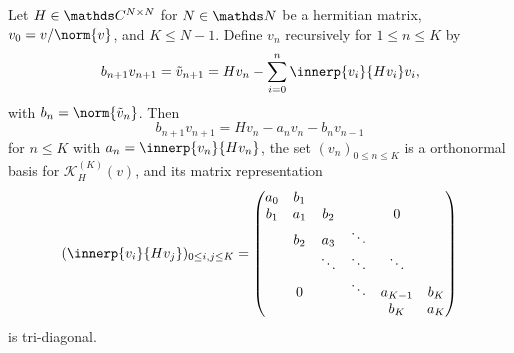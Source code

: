 \begin{lemma}
    Let \(H\in \C^{N\times N}\) for \(N\in\N\) be a hermitian matrix, \(v_0 = v / \norm{v}\), and \(K \leq N-1\).
    Define \(v_n\) recursively for \(1 \leq n \leq K\) by
    \begin{equation}
        b_{n+1}v_{n+1} = \tilde v_{n+1} = H v_n - \sum_{i=0}^n \innerp{v_i}{H v_i} v_i
        ,
    \end{equation}
    with \(b_n = \norm{\tilde v_n}\).
    Then
    \begin{equation}
        b_{n+1} v_{n+1} = H v_n - a_n v_n - b_n v_{n-1}
    \end{equation}
    for \(n\leq K\) with \(a_n = \innerp{v_n}{H v_n}\),
    the set \((v_n)_{0\leq n \leq K}\) is a orthonormal basis for \(\mathcal{K}^{(K)}_H(v)\), and its matrix representation
    \begin{equation}
        (\innerp{v_i}{H v_j})_{0 \leq i,j \leq K} = 
        \begin{pmatrix}
            a_0 & b_1 &        &        &         &    \\
            b_1 & a_1 & b_2    &        &   0     &    \\
                & b_2 & a_3    & \ddots &         &    \\
                &     & \ddots & \ddots & \ddots  &    \\
                & 0   &        & \ddots & a_{K-1} & b_K\\
                &     &        &        & b_K     & a_{K}
        \end{pmatrix}
    \end{equation}
    is tri-diagonal.
\end{lemma}









